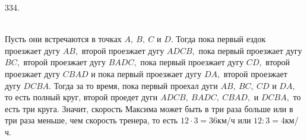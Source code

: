 334.\begin{figure}[ht!]
\end{figure}\\
Пусть они встречаются в точках $A,\ B,\ C$ и $D.$ Тогда пока первый ездок проезжает дугу $AB,$ второй проезжает дугу $ADCB,$ пока первый проезжает дугу $BC,$ второй проезжает дугу $BADC,$ пока первый проезжает дугу $CD,$ второй проезжает дугу $CBAD$ и пока первый проезжает дугу $DA,$ второй проезжает дугу $DCBA.$ Тогда за то время, пока первый проехал дуги $AB,\ BC,\ CD$ и $DA,$ то есть полный круг, второй проедет дуги $ADCB,\ BADC,\ CBAD,$ и $DCBA,$ то есть три круга. Значит, скорость Максима может быть в три раза больше или в три раза меньше, чем скорость тренера, то есть $12\cdot3=36$км/ч или $12:3=4$км/ч.\\
